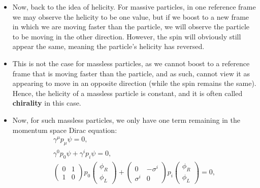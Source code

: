 \begin{itemize}
        \begin{equation}
            \psi \rightarrow \psi^{\prime} = 
                \begin{pmatrix}
                    e^{\frac{i}{2}\vv{\sigma}\left(\vv{\theta - i\varphi}\right)} & 0 \\
                    0 & e^{\frac{i}{2}\vv{\sigma}\left(\vv{\theta + i\varphi}\right)}
                \end{pmatrix} 
                \begin{pmatrix}\phi_R \\ \phi_L\end{pmatrix},
        \end{equation}
        where $\vv{\theta}$ is a vector of rotation parameters, $\vv{\varphi}$ is a vector of boost parameters, and $\vv{\sigma}$ is the familiar vector of Pauli spin matrices.
    \item Now, back to the idea of helicity. For massive particles, in one reference frame we may observe the helicity to be one value, but if we boost to a new frame in which we are moving faster than the particle, we will observe the particle to be moving in the other direction. However, the spin will obviously still appear the same, meaning the particle's helicity has reversed.
    \item This is not the case for massless particles, as we cannot boost to a reference frame that is moving faster than the particle, and as such, cannot view it as appearing to move in an opposite direction (while the spin remains the same). Hence, the helicity of a massless particle is constant, and it is often called \textbf{chirality} in this case.
    \item Now, for such massless particles, we only have one term remaining in the momentum space Dirac equation:
        \begin{gather*}
            \gamma^{\mu}p_{\mu} \psi = 0, \\
            \gamma^0p_0\psi + \gamma^ip_i\psi = 0, \\
            \begin{pmatrix}0 & 1 \\ 1 & 0\end{pmatrix} p_0 \begin{pmatrix}\phi_R \\ \phi_L\end{pmatrix} + \begin{pmatrix}0 & -\sigma^i \\ \sigma^i & 0\end{pmatrix} p_i \begin{pmatrix}\phi_R \\ \phi_L\end{pmatrix} = 0,

\end{gather*}
\end{itemize}

